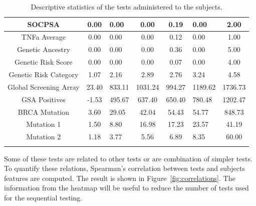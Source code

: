 \documentclass[]{article}
\begin{document}
\begin{longtable}{|c|c|p{1.5cm}|c|c|p{1.5cm}|c|}
\hline 
           SOCPSA &     0.00       &   0.00       &     0.00  &   0.19  &           0.00  &       2.00  \\
\hline
     TNFa Average &     0.00       &   0.00       &     0.00  &   0.12  &           0.00  &       1.00  \\
\hline
 Genetic Ancestry &     0.00       &   0.00       &     0.00  &   0.36  &           0.00  &       5.00  \\
\hline
 Genetic Risk Score &     0.00       &   0.00       &     0.00  &   0.07  &           0.00  &       4.00  \\
\hline
 Genetic Risk Category &     1.07       &   2.16       &     2.89  &   2.76  &           3.24  &       4.58  \\
\hline
 Global Screening Array &    23.40       & 833.11       &  1031.24  & 994.27  &        1189.62  &    1736.73  \\
\hline
   GSA Positives &    -1.53       & 495.67       &   637.40  & 650.40  &         780.48  &    1202.47  \\
\hline
   BRCA Mutation &     3.60       &  29.05       &    42.04  &  54.43  &          54.77  &     848.73  \\
\hline
   Mutation 1 &     1.50       &   8.80       &    16.98  &  17.23  &          23.57  &      41.19  \\
\hline
   Mutation 2 &     1.18       &   3.77       &     5.56  &   6.89  &           8.35  &      60.00  \\ 
\hline
\caption{Descriptive statistics of the tests administered to the subjects.}
\label{table:summary}
\end{longtable}

\noindent Some of these tests are related to other tests or are combination of simpler tests. To quantify these
relations, Spearman's correlation between tests and subjects features are computed. The result is shown 
in Figure~\ref{fig:correlations}. The information from the heatmap will be useful to reduce the number 
of tests used for the sequential testing. \\
\end{document}

